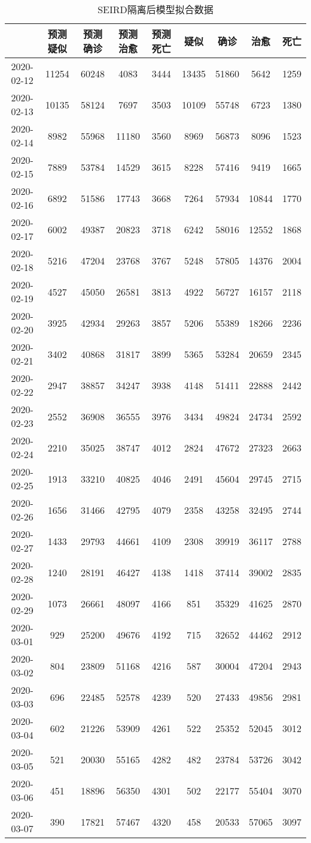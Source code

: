 \begin{longtable}{ccccccccc}
\caption{SEIRD隔离后模型拟合数据}\\
\hline
&预测疑似&预测确诊&预测治愈&预测死亡&疑似&确诊&治愈&死亡\\
\hline
2020-02-12&11254&60248&4083&3444&13435&51860&5642&1259\\
2020-02-13&10135&58124&7697&3503&10109&55748&6723&1380\\
2020-02-14&8982&55968&11180&3560&8969&56873&8096&1523\\
2020-02-15&7889&53784&14529&3615&8228&57416&9419&1665\\
2020-02-16&6892&51586&17743&3668&7264&57934&10844&1770\\
2020-02-17&6002&49387&20823&3718&6242&58016&12552&1868\\
2020-02-18&5216&47204&23768&3767&5248&57805&14376&2004\\
2020-02-19&4527&45050&26581&3813&4922&56727&16157&2118\\
2020-02-20&3925&42934&29263&3857&5206&55389&18266&2236\\
2020-02-21&3402&40868&31817&3899&5365&53284&20659&2345\\
2020-02-22&2947&38857&34247&3938&4148&51411&22888&2442\\
2020-02-23&2552&36908&36555&3976&3434&49824&24734&2592\\
2020-02-24&2210&35025&38747&4012&2824&47672&27323&2663\\
2020-02-25&1913&33210&40825&4046&2491&45604&29745&2715\\
2020-02-26&1656&31466&42795&4079&2358&43258&32495&2744\\
2020-02-27&1433&29793&44661&4109&2308&39919&36117&2788\\
2020-02-28&1240&28191&46427&4138&1418&37414&39002&2835\\
2020-02-29&1073&26661&48097&4166&851&35329&41625&2870\\
2020-03-01&929&25200&49676&4192&715&32652&44462&2912\\
2020-03-02&804&23809&51168&4216&587&30004&47204&2943\\
2020-03-03&696&22485&52578&4239&520&27433&49856&2981\\
2020-03-04&602&21226&53909&4261&522&25352&52045&3012\\
2020-03-05&521&20030&55165&4282&482&23784&53726&3042\\
2020-03-06&451&18896&56350&4301&502&22177&55404&3070\\
2020-03-07&390&17821&57467&4320&458&20533&57065&3097\\

\end{longtable}
